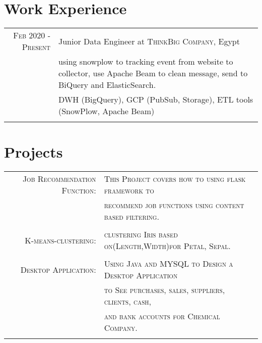 \documentclass[a4paper,10pt]{article}
\begin{document}
\section{Work Experience}

\begin{tabular}{r|p{11cm}}

\textsc{Feb 2020 - Present} &  Junior Data Engineer at  \textsc{ThinkBig Company}, Egypt \emph{}\\
& \footnotesize{using snowplow to tracking event from website to collector, use Apache Beam to clean message, send to BiQuery and ElasticSearch.}\\
& \footnotesize{DWH (BigQuery), GCP (PubSub, Storage), ETL tools (SnowPlow, Apache Beam)}\\

\multicolumn{2}{c}{} \\

\end{tabular}

\section{Projects}

\begin{tabular}{r|p{11cm}}

\textsc{Job Recommendation Function: }  &  \textsc{This Project covers how to using flask framework to}  \emph{}\\
& \textsc{recommend job functions using content based filtering. }\\
\multicolumn{2}{c}{} \\


\textsc{K-means-clustering: }  &  \textsc{clustering Iris based on(Length,Width)for Petal, Sepal.}  \emph{}\\
\multicolumn{2}{c}{} \\

\textsc{Desktop Application: }  &  \textsc{Using Java and MYSQL to Design a Desktop Application  }\emph{}\\
& \textsc{to  See purchases, sales, suppliers, clients, cash, }  \emph{}\\
& \textsc{ and bank accounts  for Chemical Company.} \emph{}\\
\multicolumn{3}{c}{} \\


\end{tabular}
\end{document}
